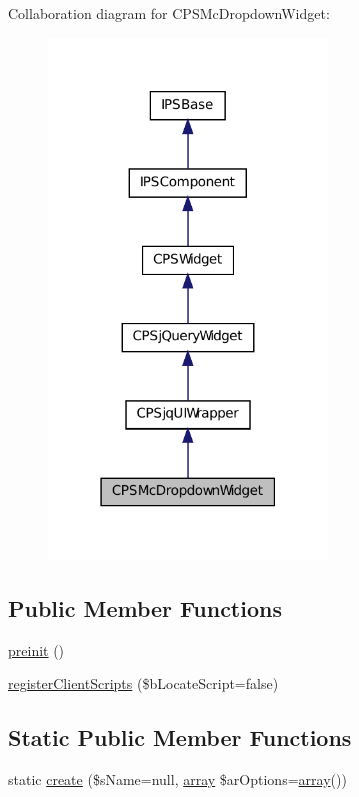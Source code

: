 Collaboration diagram for CPSMcDropdownWidget:\nopagebreak
\begin{figure}[H]
\begin{center}
\leavevmode
\includegraphics[width=210pt]{classCPSMcDropdownWidget__coll__graph}
\end{center}
\end{figure}
\subsection*{Public Member Functions}
\begin{DoxyCompactItemize}
\item 
\hyperlink{classCPSMcDropdownWidget_a2dc262e99b1c246b56f27626bfe699ff}{preinit} ()
\item 
\hyperlink{classCPSMcDropdownWidget_ac02a66bde8e72e4909137bf748edf665}{registerClientScripts} (\$bLocateScript=false)
\end{DoxyCompactItemize}
\subsection*{Static Public Member Functions}
\begin{DoxyCompactItemize}
\item 
static \hyperlink{classCPSMcDropdownWidget_a0ffc269a208148ade57c7eb608a4562a}{create} (\$sName=null, \hyperlink{list_8php_aa3205d038c7f8feb5c9f01ac4dfadc88}{array} \$arOptions=\hyperlink{list_8php_aa3205d038c7f8feb5c9f01ac4dfadc88}{array}())
\end{DoxyCompactItemize}
